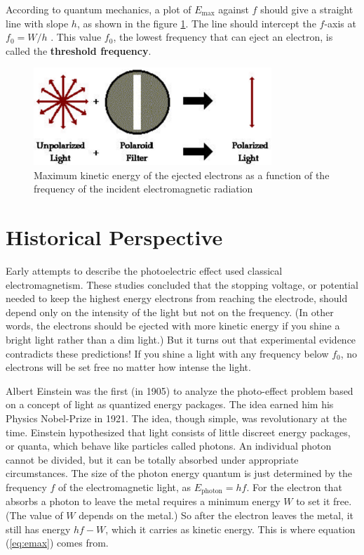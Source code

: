 According to quantum mechanics, a plot of $E_{\mathrm{max}}$ against $f$ should give a straight line with slope $h$, as shown in the figure {\ref{fig:threshold}}. The line should intercept the $f$-axis at $f_0 = W / h$ . This value $f_0$, the lowest frequency that can eject an electron, is called the \textbf{threshold frequency}.
\begin{figure}[h]
\centering
\includegraphics[width=0.8\textwidth]{./Exp8/pic/image1.png}
\caption{Maximum kinetic energy of the ejected electrons as a function of the frequency of the incident electromagnetic radiation}
\label{fig:threshold}
\end{figure} 

\section{Historical Perspective}
Early attempts to describe the photoelectric effect used classical electromagnetism. These studies concluded that the stopping voltage, or potential needed to keep the highest energy electrons from reaching the electrode, should depend only on the intensity of the light but not on the frequency. (In other words, the electrons should be ejected with more kinetic energy if you shine a bright light rather than a dim light.) But it turns out that experimental evidence contradicts these predictions! If you shine a light with any frequency below $f_0$, no electrons will be set free no matter how intense the light.\myskip

Albert Einstein was the first (in 1905) to analyze the photo-effect problem based on a concept of light as quantized energy packages. The idea earned him his Physics Nobel-Prize in 1921. The idea, though simple, was revolutionary at the time. Einstein hypothesized that light consists of little discreet energy packages, or quanta, which behave like particles called photons. An individual photon cannot be divided, but it can be totally absorbed under appropriate circumstances. The size of the photon energy quantum is just determined by the frequency $f$ of the electromagnetic light, as $E_{\mathrm{photon}}=hf$. For the electron that absorbs a photon to leave the metal requires a minimum energy $W$ to set it free. (The value of $W$ depends on the metal.) So after the electron leaves the metal, it still has energy $hf - W$, which it carries as kinetic energy. This is where equation ({\ref{eq:emax}}) comes from. \myskip

